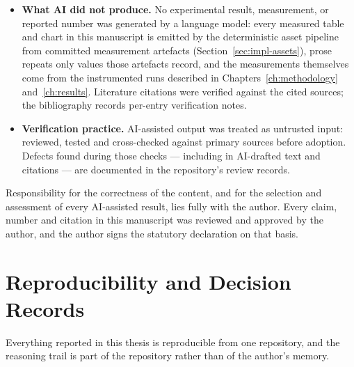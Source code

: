 \begin{itemize}
        the author's own evidence base --- the committed measurement artefacts,
        decision records and audit documents --- and revised and approved by the
        author, who takes full responsibility for every claim. Multiple review
        passes, documented under \texttt{docs/reviews/} in the repository ---
        including one adversarial re-audit of a prior pass --- checked the
        manuscript's claims against the committed evidence and the cited sources.
  \item \textbf{What AI did not produce.} No experimental result, measurement,
        or reported number was generated by a language model: every measured table and
        chart in this manuscript is emitted by the deterministic asset pipeline from
        committed measurement artefacts (Section~\ref{sec:impl-assets}), prose repeats
        only values those artefacts record, and the measurements
        themselves come from the instrumented runs described in
        Chapters~\ref{ch:methodology} and~\ref{ch:results}. Literature citations
        were verified against the cited sources; the bibliography records
        per-entry verification notes.
  \item \textbf{Verification practice.} AI-assisted output was treated as untrusted
        input: reviewed, tested and cross-checked against primary sources before
        adoption. Defects found during those checks --- including in AI-drafted
        text and citations --- are documented in the repository's review records.
\end{itemize}

Responsibility for the correctness of the content, and for the selection and assessment
of every AI-assisted result, lies fully with the author. Every claim, number and citation
in this manuscript was reviewed and approved by the author, and the author signs the
statutory declaration on that basis.

\chapter{Reproducibility and Decision Records}
\label{app:repro}

Everything reported in this thesis is reproducible from one repository, and the
reasoning trail is part of the repository rather than of the author's memory.

